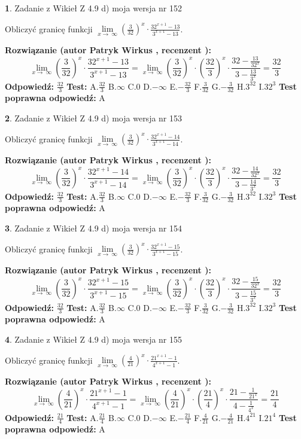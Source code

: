 \documentclass[12pt, a4paper]{article}
\theoremstyle{definition} %
\newtheorem{zad}{}
\newcommand{\zadStart}[1]{\begin{zad}#1\newline}
\newcommand{\zadStop}{\end{zad}}
\newcommand{\rozwStart}[2]{\noindent \textbf{Rozwiązanie (autor #1 , recenzent #2): }\newline}
\newcommand{\rozwStop}{\newline}
\newcommand{\odpStart}{\noindent \textbf{Odpowiedź:}\newline}
\newcommand{\odpStop}{\newline}
\newcommand{\testStart}{\noindent \textbf{Test:}\newline}
\newcommand{\testStop}{\newline}
\newcommand{\kluczStart}{\noindent \textbf{Test poprawna odpowiedź:}\newline}
\newcommand{\kluczStop}{\newline}
\begin{document}
\zadStart{Zadanie z Wikieł Z 4.9 d) moja wersja nr 152}


Obliczyć granicę funkcji  $\lim\limits_{x\to\ \infty}(\frac{3}{32})^{x}\cdot\frac{32^{x+1}-13}{3^{x+1}-13}$.
\zadStop
\rozwStart{Patryk Wirkus}{}
$$\lim\limits_{x\to\ \infty}(\frac{3}{32})^{x}\cdot\frac{32^{x+1}-13}{3^{x+1}-13}=\lim\limits_{x\to\ \infty}(\frac{3}{32})^{x}\cdot(\frac{32}{3})^{x} \cdot \frac{32-\frac{13}{32^{x}}}{3-\frac{13}{3^{x}}} = \frac{32}{3}$$
\rozwStop
\odpStart
$\frac{32}{3}$
\odpStop
\testStart
A.$\frac{32}{3}$ B.$\infty$ C.$0$ D.$-\infty$ E.$-\frac{32}{3}$
F.$\frac{3}{32}$ G.$-\frac{3}{32}$
H.$3^{32}$
I.$32^{3}$
\testStop
\kluczStart
A
\kluczStop



\zadStart{Zadanie z Wikieł Z 4.9 d) moja wersja nr 153}


Obliczyć granicę funkcji  $\lim\limits_{x\to\ \infty}(\frac{3}{32})^{x}\cdot\frac{32^{x+1}-14}{3^{x+1}-14}$.
\zadStop
\rozwStart{Patryk Wirkus}{}
$$\lim\limits_{x\to\ \infty}(\frac{3}{32})^{x}\cdot\frac{32^{x+1}-14}{3^{x+1}-14}=\lim\limits_{x\to\ \infty}(\frac{3}{32})^{x}\cdot(\frac{32}{3})^{x} \cdot \frac{32-\frac{14}{32^{x}}}{3-\frac{14}{3^{x}}} = \frac{32}{3}$$
\rozwStop
\odpStart
$\frac{32}{3}$
\odpStop
\testStart
A.$\frac{32}{3}$ B.$\infty$ C.$0$ D.$-\infty$ E.$-\frac{32}{3}$
F.$\frac{3}{32}$ G.$-\frac{3}{32}$
H.$3^{32}$
I.$32^{3}$
\testStop
\kluczStart
A
\kluczStop



\zadStart{Zadanie z Wikieł Z 4.9 d) moja wersja nr 154}


Obliczyć granicę funkcji  $\lim\limits_{x\to\ \infty}(\frac{3}{32})^{x}\cdot\frac{32^{x+1}-15}{3^{x+1}-15}$.
\zadStop
\rozwStart{Patryk Wirkus}{}
$$\lim\limits_{x\to\ \infty}(\frac{3}{32})^{x}\cdot\frac{32^{x+1}-15}{3^{x+1}-15}=\lim\limits_{x\to\ \infty}(\frac{3}{32})^{x}\cdot(\frac{32}{3})^{x} \cdot \frac{32-\frac{15}{32^{x}}}{3-\frac{15}{3^{x}}} = \frac{32}{3}$$
\rozwStop
\odpStart
$\frac{32}{3}$
\odpStop
\testStart
A.$\frac{32}{3}$ B.$\infty$ C.$0$ D.$-\infty$ E.$-\frac{32}{3}$
F.$\frac{3}{32}$ G.$-\frac{3}{32}$
H.$3^{32}$
I.$32^{3}$
\testStop
\kluczStart
A
\kluczStop



\zadStart{Zadanie z Wikieł Z 4.9 d) moja wersja nr 155}


Obliczyć granicę funkcji  $\lim\limits_{x\to\ \infty}(\frac{4}{21})^{x}\cdot\frac{21^{x+1}-1}{4^{x+1}-1}$.
\zadStop
\rozwStart{Patryk Wirkus}{}
$$\lim\limits_{x\to\ \infty}(\frac{4}{21})^{x}\cdot\frac{21^{x+1}-1}{4^{x+1}-1}=\lim\limits_{x\to\ \infty}(\frac{4}{21})^{x}\cdot(\frac{21}{4})^{x} \cdot \frac{21-\frac{1}{21^{x}}}{4-\frac{1}{4^{x}}} = \frac{21}{4}$$
\rozwStop
\odpStart
$\frac{21}{4}$
\odpStop
\testStart
A.$\frac{21}{4}$ B.$\infty$ C.$0$ D.$-\infty$ E.$-\frac{21}{4}$
F.$\frac{4}{21}$ G.$-\frac{4}{21}$
H.$4^{21}$
I.$21^{4}$
\testStop
\kluczStart
A
\kluczStop
\end{document}
